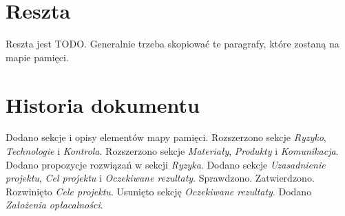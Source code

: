 \documentclass[10pt]{dokument-ppi}
\begin{document}
\section{Reszta}

Reszta jest \textsc{TODO}. Generalnie trzeba skopiować te paragrafy, które
zostaną na mapie pamięci.

\newpage
\section*{Historia dokumentu}
\begin{versions}
        Dodano sekcje i opisy elementów mapy pamięci.
        Rozszerzono sekcje \emph{Ryzyko}, \emph{Technologie} i \emph{Kontrola}.
        Rozszerzono sekcje \emph{Materiały}, \emph{Produkty} i \emph{Komunikacja}.
        Dodano propozycje rozwiązań w sekcji \emph{Ryzyka}.
        Dodano sekcje \emph{Uzasadnienie projektu}, \emph{Cel projektu} i
        \emph{Oczekiwane rezultaty}.
        Sprawdzono.
        Zatwierdzono.
        Rozwinięto \emph{Cele projektu}. Usunięto sekcję \emph{Oczekiwane
        rezultaty}. Dodano \emph{Założenia opłacalności}.
\end{versions}
\end{document}
